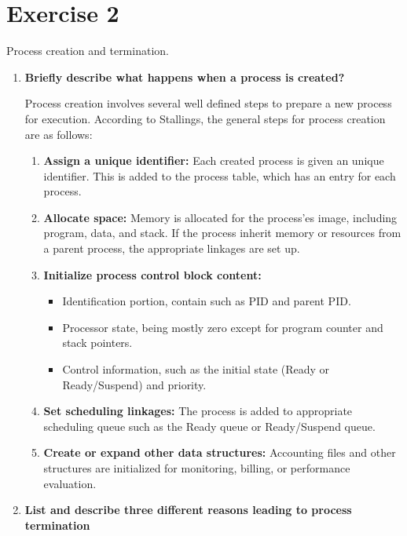 \documentclass{article}
\newcommand{\exercise}[1]{
    \section*{Exercise #1}
    \markboth{Exercise #1}{}
}
\begin{document}
\newpage
\exercise{2}
Process creation and termination.
\begin{enumerate}[label=\textbf{\alph*})]
    \item
    \textbf{Briefly describe what happens when a process is created?}

    Process creation involves several well defined steps to prepare a new
    process for execution. According to Stallings\cite{stallings}, the general
    steps for process creation are as follows:
    
    \begin{enumerate}[label=\textbf{\arabic*.}]
        \item \textbf{Assign a unique identifier:} Each created process is given an unique
        identifier. This is added to the process table, which has an entry for each process.
    
        \item \textbf{Allocate space:} Memory is allocated for the process'es image,
        including program, data, and stack. If the process inherit memory or
        resources from a parent process, the appropriate linkages are set up.
    
        \item \textbf{Initialize process control block content:}
        \begin{itemize}
            \item Identification portion, contain such as PID and parent PID.
            \item Processor state, being mostly zero except for program counter and stack pointers.
            \item Control information, such as the initial state
            (Ready or Ready/Suspend) and priority.
        \end{itemize}
    
        \item \textbf{Set scheduling linkages:} The process is added to
        appropriate scheduling queue such as the Ready queue or Ready/Suspend queue.
    
        \item \textbf{Create or expand other data structures:} Accounting files and
        other structures are initialized for monitoring, billing, or performance evaluation.
    \end{enumerate}
        

    \pagebreak
    \item
    \textbf{List and describe three different reasons leading to process termination}


\end{enumerate}
\end{document}
